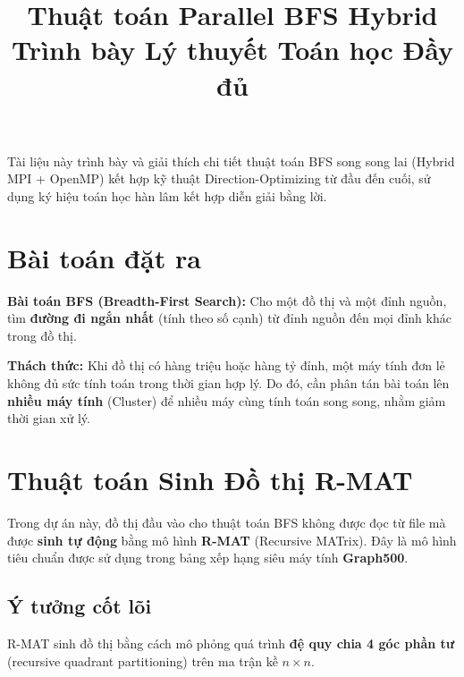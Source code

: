 \documentclass[12pt,a4paper]{article}
\title{\textbf{Thuật toán Parallel BFS Hybrid} \\ \large Trình bày Lý thuyết Toán học Đầy đủ}
\author{}
\date{}
\begin{document}
\maketitle

\begin{explain}
Tài liệu này trình bày và giải thích chi tiết thuật toán BFS song song lai (Hybrid MPI + OpenMP) kết hợp kỹ thuật Direction-Optimizing từ đầu đến cuối, sử dụng ký hiệu toán học hàn lâm kết hợp diễn giải bằng lời.
\end{explain}

\section{Bài toán đặt ra}

\textbf{Bài toán BFS (Breadth-First Search):} Cho một đồ thị và một đỉnh nguồn, tìm \textbf{đường đi ngắn nhất} (tính theo số cạnh) từ đỉnh nguồn đến mọi đỉnh khác trong đồ thị.

\textbf{Thách thức:} Khi đồ thị có hàng triệu hoặc hàng tỷ đỉnh, một máy tính đơn lẻ không đủ sức tính toán trong thời gian hợp lý. Do đó, cần phân tán bài toán lên \textbf{nhiều máy tính} (Cluster) để nhiều máy cùng tính toán song song, nhằm giảm thời gian xử lý.

\section{Thuật toán Sinh Đồ thị R-MAT}

Trong dự án này, đồ thị đầu vào cho thuật toán BFS không được đọc từ file mà được \textbf{sinh tự động} bằng mô hình \textbf{R-MAT} (Recursive MATrix). Đây là mô hình tiêu chuẩn được sử dụng trong bảng xếp hạng siêu máy tính \textbf{Graph500}.

\subsection{Ý tưởng cốt lõi}

R-MAT sinh đồ thị bằng cách mô phỏng quá trình \textbf{đệ quy chia 4 góc phần tư} (recursive quadrant partitioning) trên ma trận kề $n \times n$.
\end{document}
